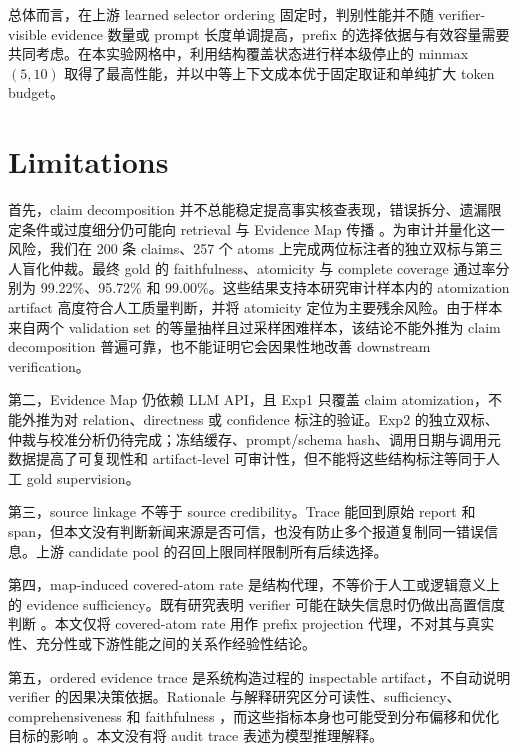 \documentclass[letterpaper]{article}
\begin{document}
总体而言，在上游 learned selector ordering 固定时，判别性能并不随 verifier-visible evidence 数量或 prompt 长度单调提高，prefix 的选择依据与有效容量需要共同考虑。在本实验网格中，利用结构覆盖状态进行样本级停止的 minmax$(5,10)$ 取得了最高性能，并以中等上下文成本优于固定取证和单纯扩大 token budget。

\FloatBarrier
\section{Limitations}

首先，claim decomposition 并不总能稳定提高事实核查表现，错误拆分、遗漏限定条件或过度细分仍可能向 retrieval 与 Evidence Map 传播 \citep{Hu2025DecompositionDilemmas}。为审计并量化这一风险，我们在 200 条 claims、257 个 atoms 上完成两位标注者的独立双标与第三人盲化仲裁。最终 gold 的 faithfulness、atomicity 与 complete coverage 通过率分别为 99.22\%、95.72\% 和 99.00\%。这些结果支持本研究审计样本内的 atomization artifact 高度符合人工质量判断，并将 atomicity 定位为主要残余风险。由于样本来自两个 validation set 的等量抽样且过采样困难样本，该结论不能外推为 claim decomposition 普遍可靠，也不能证明它会因果性地改善 downstream verification。

第二，Evidence Map 仍依赖 LLM API，且 Exp1 只覆盖 claim atomization，不能外推为对 relation、directness 或 confidence 标注的验证。Exp2 的独立双标、仲裁与校准分析仍待完成；冻结缓存、prompt/schema hash、调用日期与调用元数据提高了可复现性和 artifact-level 可审计性，但不能将这些结构标注等同于人工 gold supervision。

第三，source linkage 不等于 source credibility。Trace 能回到原始 report 和 span，但本文没有判断新闻来源是否可信，也没有防止多个报道复制同一错误信息。上游 candidate pool 的召回上限同样限制所有后续选择。

第四，map-induced covered-atom rate 是结构代理，不等价于人工或逻辑意义上的 evidence sufficiency。既有研究表明 verifier 可能在缺失信息时仍做出高置信度判断 \citep{Atanasova2022Insufficient}。本文仅将 covered-atom rate 用作 prefix projection 代理，不对其与真实性、充分性或下游性能之间的关系作经验性结论。

第五，ordered evidence trace 是系统构造过程的 inspectable artifact，不自动说明 verifier 的因果决策依据。Rationale 与解释研究区分可读性、sufficiency、comprehensiveness 和 faithfulness \citep{Lei2016Rationalizing,DeYoung2020ERASER,Jacovi2020Faithfulness}，而这些指标本身也可能受到分布偏移和优化目标的影响 \citep{Hsia2024Goodhart}。本文没有将 audit trace 表述为模型推理解释。
\end{document}
